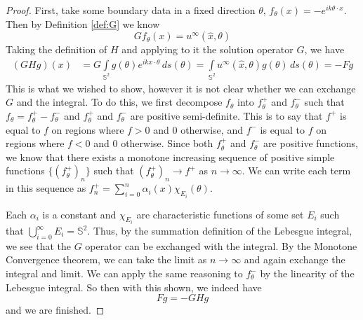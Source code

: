 \documentclass[]{article}
\renewcommand{\S}{\mathbb S}
\begin{document}
				\begin{proof}
					First, take some boundary data in a fixed direction $\theta$, $f_\theta(x)= -e^{ik\theta \cdot x}$. Then by Definition \ref{def:G} we know
					\begin{equation}
						Gf_\theta(x) = u^\infty(\hat x, \theta)
					\end{equation}
					Taking the definition of $H$ and applying to it the solution operator $G$, we have 
					\begin{align}
						(GHg)(x) &= G\int\limits_{\mathbb S^2} g(\theta)e^{ikx\cdot \theta}\,ds(\theta)=  \int\limits_{\mathbb S^2}u^\infty(\hat x, \theta)g(\theta)\, ds(\theta)= -Fg
					\end{align}
					This is what we wished to show, however it is not clear whether we can exchange $G$ and the integral. To do this, we first decompose $f_\theta$ into $f_\theta^+$ and $f_\theta^-$ such that $f_\theta = f_\theta^+-f_\theta^-$ and $f_\theta^+$ and $f_\theta^-$ are positive semi-definite. This is to say that $f^+$ is equal to $f$ on regions where $f>0$ and 0 otherwise, and $f^-$ is equal to $f$ on regions where $f<0$ and 0 otherwise. Since both  $f_\theta^+$ and $f_\theta^-$ are positive functions, we know that there exists a monotone increasing sequence of positive simple functions $\{(f^+_\theta)_{n}\}$ such that $(f^+_\theta)_{n}\to f^+$ as $n \to \infty$. We can write each term in this sequence as $f^+_{n} = \sum^n_{i=0}\alpha_i(x)\chi_{E_i}(\theta)$.
					
					Each $\alpha_i$ is a constant and $\chi_{E_i}$ are characteristic functions of some set $E_i$ such that $\bigcup_{i = 0}^\infty E_i = \S^2$. Thus, by the summation definition of the Lebesgue integral, we see that the $G$ operator can be exchanged with the integral. By the Monotone Convergence theorem, we can take the limit as $n\to \infty$ and again exchange the integral and limit. We can apply the same reasoning to $f_\theta^-$ by the linearity of the Lebesgue integral. So then with this shown, we indeed have 
					\begin{equation}
						Fg = -GHg 
					\end{equation}
					and we are finished.
				\end{proof}
\end{document}
